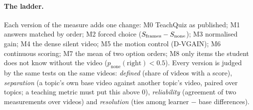 \paragraph{The ladder.} Each version of the measure adds one change: M0 TeachQuiz as published; M1 answers matched by order; M2 forced
choice ($S_{\text{frames}} - S_{\text{none}}$); M3 normalised gain; M4 the dense silent video; M5 the motion control
(D-VGAIN); M6 continuous scoring; M7 the mean of two option orders; M8 only items the student does not know without the video
($p_{\text{none}}(\text{right}) < 0.5$). Every version is judged by the same tests on the same videos:
\emph{defined} (share of videos with a score), \emph{separation} (a topic's own base video against another topic's
video, paired over topics; a teaching metric must put this above 0), \emph{reliability} (agreement of two measurements
over videos) and \emph{resolution} (ties among learner $-$ base differences).


